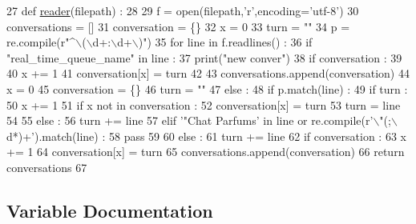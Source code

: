\begin{DoxyCode}
27 \textcolor{keyword}{def }\hyperlink{namespaceparlai_1_1scripts_1_1cologne2FB_ac3f89c025290a81b76a7573f7c1e5d7a}{reader}(filepath) : 
28 
29     f = open(filepath,\textcolor{stringliteral}{'r',encoding='}utf-8')
30     conversations = []
31     conversation = \{\}
32     x = 0
33     turn = \textcolor{stringliteral}{""}
34     p = re.compile(\textcolor{stringliteral}{r"^\(\backslash\)(\(\backslash\)d+:\(\backslash\)d+\(\backslash\))"})
35     \textcolor{keywordflow}{for} line \textcolor{keywordflow}{in} f.readlines() :
36         \textcolor{keywordflow}{if} \textcolor{stringliteral}{"real\_time\_queue\_name"} \textcolor{keywordflow}{in} line : 
37             print(\textcolor{stringliteral}{"new conver"})
38             \textcolor{keywordflow}{if} conversation :
39 
40                 x += 1 
41                 conversation[x] = turn
42 
43                 conversations.append(conversation)
44             x = 0
45             conversation = \{\}
46             turn = \textcolor{stringliteral}{""}
47         \textcolor{keywordflow}{else} : 
48             \textcolor{keywordflow}{if} p.match(line) : 
49                 \textcolor{keywordflow}{if} turn : 
50                     x += 1 
51                     \textcolor{keywordflow}{if} x \textcolor{keywordflow}{not} \textcolor{keywordflow}{in} conversation : 
52                         conversation[x] = turn
53                     turn = line
54 
55                 \textcolor{keywordflow}{else} : 
56                     turn += line    
57             \textcolor{keywordflow}{elif} \textcolor{stringliteral}{'"Chat Parfums'} \textcolor{keywordflow}{in} line \textcolor{keywordflow}{or} re.compile(\textcolor{stringliteral}{r'\(\backslash\)"(;\(\backslash\)d*)+'}).match(line) : 
58                 \textcolor{keywordflow}{pass}
59 
60             \textcolor{keywordflow}{else} : 
61                 turn += line
62     \textcolor{keywordflow}{if} conversation : 
63         x += 1 
64         conversation[x] = turn
65         conversations.append(conversation)
66     \textcolor{keywordflow}{return} conversations
67 
\end{DoxyCode}


\subsection{Variable Documentation}
\mbox{\label{namespaceparlai_1_1scripts_1_1cologne2FB_a5f672b8f854fe6a7d69411a32a620f70}} 
